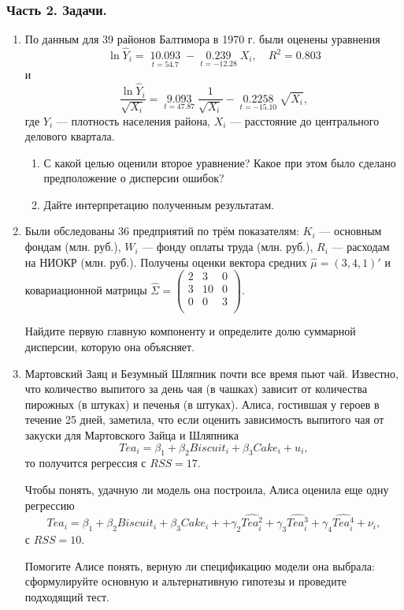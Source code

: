 \documentclass[12pt, a4paper]{article}
\theoremstyle{definition}
\begin{document}
\subsubsection*{Часть 2. Задачи.}


\begin{enumerate}

\item По данным для 39 районов Балтимора в 1970 г. были оценены уравнения
\[\ln {\hat Y_i} = \mathop {10.093}\limits_{t = 54.7}  - \mathop {0.239}\limits_{t =  - 12.28} {X_i},\quad {R^2} = 0.803\]
и
\[\frac{{\ln {{\hat Y}_i}}}{{\sqrt {{X_i}} }} = \mathop {9.093}\limits_{t = 47.87} \frac{1}{{\sqrt {{X_i}} }} - \mathop {0.2258}\limits_{t =  - 15.10} \sqrt {{X_i}} ,\]
где $Y_i$ — плотность населения района, $X_i$ — расстояние до центрального делового квартала.

\begin{enumerate}
\item С какой целью оценили второе уравнение? Какое при этом было сделано предположение о дисперсии ошибок?
\item Дайте интерпретацию полученным результатам.
\end{enumerate}

\item Были обследованы 36 предприятий по трём показателям:  $K_i$ — основным фондам (млн. руб.), $W_i$ — фонду оплаты труда (млн. руб.), $R_i$ — расходам на НИОКР (млн. руб.). Получены оценки вектора средних $\hat \mu = (3, 4, 1)'$ и ковариационной матрицы  $\hat\Sigma = \begin{pmatrix}
2 & 3 & 0 \\
3 & 10 & 0 \\
0 & 0 & 3 \\
\end{pmatrix}
$.

Найдите первую главную компоненту и определите долю суммарной дисперсии, которую она объясняет.

\item Мартовский Заяц и Безумный Шляпник почти все время пьют чай. Известно, что количество выпитого за день чая (в чашках) зависит от количества пирожных (в штуках) и печенья (в штуках). Алиса, гостившая у героев в течение 25 дней, заметила, что если оценить зависимость выпитого чая от закуски для Мартовского Зайца и Шляпника
\[
Tea_i = \beta_1 + \beta_2 Biscuit_i + \beta_3 Cake_i + u_i,
\]
то получится регрессия с $RSS = 17$.

Чтобы понять, удачную ли модель она построила, Алиса оценила еще одну регрессию
\[
Tea_i = \beta_1 + \beta_2 Biscuit_i + \beta_3 Cake_i +
   +\gamma_2 \widehat{Tea_i^2} +\gamma_3 \widehat{Tea_i^3} +\gamma_4 \widehat{Tea_i^4} + \nu_i,
\]
с $RSS = 10$.

Помогите Алисе понять, верную ли спецификацию модели она выбрала: сформулируйте основную и альтернативную гипотезы и проведите подходящий тест.



\end{enumerate}
\end{document}
